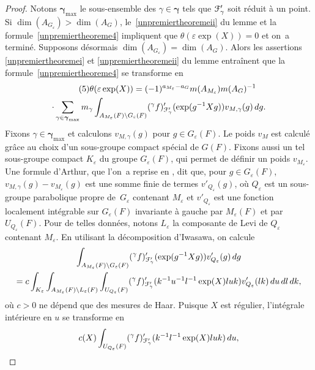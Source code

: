 \documentclass[11pt]{article}
\numberwithin{equation}{section}\providecommand{\og}{«\,}\providecommand{\fg}{\,»}
\let\mathcal \EuScript
\let\epsilon\varepsilon
\newcommand{\cF}{\mathcal{F}}
\theoremstyle{plain}
\theoremstyle{definition}
\begin{document}
\begin{proof}
Notons $\boldsymbol{\gamma}_{\max}$ le sous-ensemble des $\gamma\in \boldsymbol{\gamma}$ tels que $\cF'_{\gamma}$ soit réduit à un point. Si $\dim(A_{G_{\epsilon}})\!>\!\dim(A_{G})$, le~\eqref{unpremiertheoremeii} du lemme et la formule~\eqref{unpremiertheoreme4} impliquent que \hbox{$\theta(\epsilon \exp(X))\!=\!0$} et on~a terminé. Supposons désormais $\dim(A_{G_{\epsilon}})=\dim(A_{G})$. Alors les assertions \eqref{unpremiertheoremei} et \eqref{unpremiertheoremeii} du lemme entraînent que la formule~\eqref{unpremiertheoreme4} se transforme en
\begin{multline*}\tag{5}\label{unpremiertheoreme5}
\theta(\epsilon \exp(X))=(-1)^{a_{M_{\epsilon}}-a_{G}}m(A_{M_{\epsilon}})m(A_{G})^{-1}\\
\cdot\sum_{\gamma\in \boldsymbol{\gamma}_{\max}}m_{\gamma}
\int_{A_{M_{\epsilon}}(F)\backslash G_{\epsilon}(F)}(^{\gamma}f)'_{\cF'_{\gamma}}(\exp(g^{-1}X g))v_{M,\gamma} (g)\,dg.
\end{multline*}
Fixons $\gamma\in \boldsymbol{\gamma}_{\max}$ et calculons $v_{M,\gamma}(g)$ pour $g\in G_{\epsilon}(F)$. Le poids $v_{M}$ est calculé grâce au choix d'un sous-groupe compact spécial de $G(F)$. Fixons aussi un tel sous-groupe compact $K_{\epsilon}$ du groupe $G_{\epsilon}(F)$, qui permet de définir un poids $v_{M_{\epsilon}}$. Une formule d'Arthur, que l'on~a reprise en \cite[Lem.\,3.3]{W1}, dit que, pour $g\in G_{\epsilon}(F)$, $v_{M,\gamma}(g)-v_{M_{\epsilon}}(g)$ est une somme finie de termes $v'_{Q_{\epsilon}}(g)$, où $Q_{\epsilon}$ est un sous-groupe parabolique propre de~$G_{\epsilon}$ contenant $M_{\epsilon}$ et $v'_{Q_{\epsilon}}$ est une fonction localement intégrable sur $G_{\epsilon}(F)$ invariante à gauche par $M_{\epsilon}(F)$ et par $U_{Q_{\epsilon}}(F)$. Pour de telles données, notons $L_{\epsilon}$ la composante de Levi de $Q_{\epsilon}$ contenant $M_{\epsilon}$. En utilisant la décomposition d'Iwasawa, on calcule
\begin{multline*}
\int_{A_{M_{\epsilon}}(F)\backslash G_{\epsilon}(F)}(^{\gamma}f)'_{\cF'_{\gamma}}(\exp(g^{-1}X g))v_{Q_{\epsilon}}' (g)\,dg\\
=c\int_{K_{\epsilon}}\int_{A_{M_{\epsilon}}(F)\backslash L_{\epsilon}(F)}\int_{U_{Q_{\epsilon}}(F)}(^{\gamma}f)'_{\cF'_{\gamma}}(k^{-1}u^{-1}l^{-1}\exp(X)luk)v'_{Q_{\epsilon}}(lk)\,du\,dl\,dk,
\end{multline*}
où $c>0$ ne dépend que des mesures de Haar. Puisque $X$ est régulier, l'intégrale intérieure en $u$ se transforme en
\[
c(X)\int_{U_{Q_{\epsilon}}(F)}(^{\gamma}f)'_{\cF'_{\gamma}}(k^{-1}l^{-1}\exp(X)luk)\, du,
\]
\end{proof}
\end{document}
